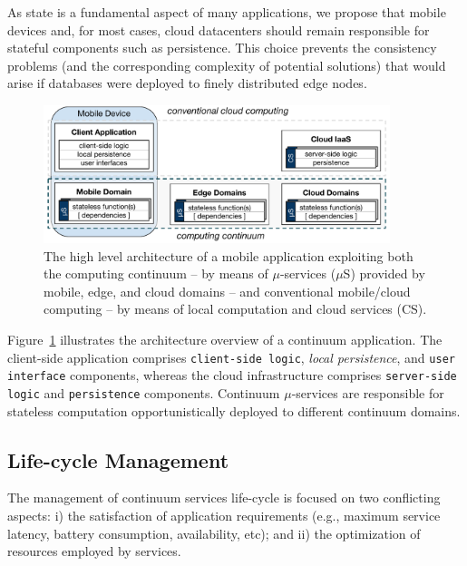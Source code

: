 As state is a fundamental aspect of many applications, we propose that mobile devices and, for most cases, cloud datacenters should remain responsible for stateful components such as persistence. This choice prevents the consistency problems (and the corresponding complexity of potential solutions) that would arise if databases were deployed to finely distributed edge nodes. %

\begin{figure}[tbp]
	\includegraphics[width=0.9\textwidth]{figs/Continuum-arch}
	\caption{The high level architecture of a mobile application exploiting both the computing continuum -- by means of $\mu$-services ($\mu$S) provided by mobile, edge, and cloud domains -- and conventional mobile/cloud computing -- by means of local computation and cloud services (CS).}
	\label{fig:Continuum-arch}
\end{figure}

Figure~\ref{fig:Continuum-arch} illustrates the architecture overview of a continuum application. The client-side application comprises \texttt{client-side logic}, \textit{local persistence}, and \texttt{user interface} components, whereas the cloud infrastructure comprises \texttt{server-side logic} and \texttt{persistence} components. Continuum $\mu$-services are responsible for stateless computation opportunistically deployed to different continuum domains.

\subsection{Life-cycle Management}

The management of continuum services life-cycle is focused on two conflicting aspects: i) the satisfaction of application requirements (e.g., maximum service latency, battery consumption, availability, etc); and ii) the optimization of resources employed by services. 


